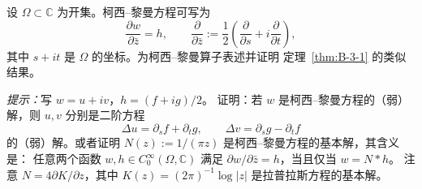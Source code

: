 \begin{exercise}\label{ex:B-3-3}
设 $\Omega\subset\mathbb C$ 为开集。柯西--黎曼方程可写为
\[
  \frac{\partial w}{\partial\bar z}=h,
  \qquad
  \frac{\partial}{\partial\bar z}
  :=\frac12\left(\frac{\partial}{\partial s}
  +i\frac{\partial}{\partial t}\right),
\]
其中 $s+it$ 是 $\Omega$ 的坐标。为柯西--黎曼算子表述并证明
定理~\ref{thm:B-3-1} 的类似结果。

\emph{提示：}写 $w=u+iv$，$h=(f+ig)/2$。
证明：若 $w$ 是柯西--黎曼方程的（弱）解，则 $u,v$ 分别是二阶方程
\[
  \Delta u=\partial_s f+\partial_t g,
  \qquad
  \Delta v=\partial_s g-\partial_t f
\]
的（弱）解。或者证明
$N(z):=1/(\pi z)$ 是柯西--黎曼方程的基本解，其含义是：
任意两个函数 $w,h\in C^\infty_0(\Omega,\mathbb C)$ 满足
$\partial w/\partial\bar z=h$，当且仅当 $w=N*h$。
注意 $N=4\partial K/\partial z$，其中
$K(z)=(2\pi)^{-1}\log|z|$ 是拉普拉斯方程的基本解。
\end{exercise}
